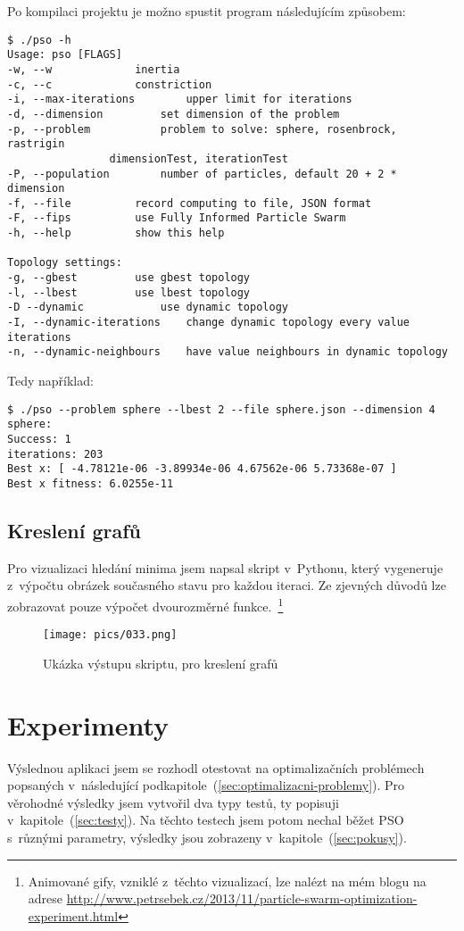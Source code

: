 \documentclass[12pt,a4paper,fleqn]{article}
\begin{document}
Po kompilaci projektu je možno spustit program následujícím způsobem:
\begin{verbatim}
$ ./pso -h
Usage: pso [FLAGS]
-w, --w				inertia
-c, --c				constriction
-i, --max-iterations		upper limit for iterations
-d, --dimension			set dimension of the problem
-p, --problem			problem to solve: sphere, rosenbrock, rastrigin
				dimensionTest, iterationTest
-P, --population		number of particles, default 20 + 2 * dimension
-f, --file			record computing to file, JSON format
-F, --fips			use Fully Informed Particle Swarm
-h, --help			show this help

Topology settings:
-g, --gbest			use gbest topology
-l, --lbest			use lbest topology
-D --dynamic			use dynamic topology
-I, --dynamic-iterations	change dynamic topology every value iterations
-n, --dynamic-neighbours	have value neighbours in dynamic topology
\end{verbatim}

Tedy například:

\begin{verbatim}
$ ./pso --problem sphere --lbest 2 --file sphere.json --dimension 4
sphere:
Success: 1
iterations: 203
Best x: [ -4.78121e-06 -3.89934e-06 4.67562e-06 5.73368e-07 ]
Best x fitness: 6.0255e-11
\end{verbatim}

\subsection{Kreslení grafů}
Pro vizualizaci hledání minima jsem napsal skript v~Pythonu, který vygeneruje z~výpočtu obrázek současného stavu pro každou iteraci. Ze zjevných důvodů lze zobrazovat pouze výpočet dvourozměrné funkce.~\footnote{Animované gify, vzniklé z~těchto vizualizací, lze nalézt na mém blogu na adrese \url{http://www.petrsebek.cz/2013/11/particle-swarm-optimization-experiment.html}}
\begin{figure*}[h]
\label{pic:plot-example}
\centering
\texttt{[image: pics/033.png]}
\caption{Ukázka výstupu skriptu, pro kreslení grafů}
\end{figure*}

\newpage
\section{Experimenty} \label{experimenty}
Výslednou aplikaci jsem se rozhodl otestovat na optimalizačních problémech popsaných v~následující podkapitole~(\ref{sec:optimalizacni-problemy}). Pro věrohodné  výsledky jsem vytvořil dva typy testů, ty popisuji v~kapitole~(\ref{sec:testy}). Na těchto testech jsem potom nechal běžet PSO s~různými parametry, výsledky jsou zobrazeny v~kapitole~(\ref{sec:pokusy}).
\end{document}
